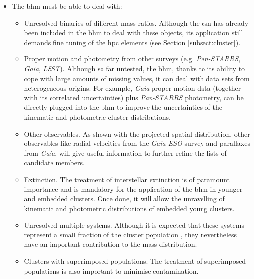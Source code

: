 \begin{itemize}
\item The \gls{bhm} must be able to deal with:
\begin{itemize}
\item Unresolved binaries of different mass ratios. Although the \gls{csn} has already been included in the \gls{bhm} to deal with these objects, its application still demands fine tuning of the \gls{hpc} elements (see Section \ref{subsect:cluster}).
\item Proper motion and photometry from other surveys (e.g. \emph{Pan-STARRS}, \emph{Gaia}, \emph{LSST}). Although so far untested, the \gls{bhm}, thanks to its ability to cope with large amounts of missing values, it can deal with data sets from heterogeneous origins. For example, \emph{Gaia} proper motion data (together with its correlated uncertainties) plus \emph{Pan-STARRS} photometry, can be directly plugged into the \gls{bhm} to improve the uncertainties of the kinematic and photometric cluster distributions. 
\item Other observables. As shown with the projected spatial distribution, other observables like radial velocities from the \emph{Gaia-ESO} survey and parallaxes from \emph{Gaia}, will give useful information to further refine the lists of candidate members.
\item Extinction. The treatment of interstellar extinction is of paramount importance and is mandatory for the application of the \gls{bhm} in younger and embedded clusters. Once done, it will allow the unravelling of kinematic and photometric distributions of embedded young clusters.

\item Unresolved multiple systems. Although it is expected that these systems represent a small fraction of the cluster population \cite[only 4\% for the triple systems][]{Duquennoy1991}, they nevertheless have an important contribution to the mass distribution. 

\item Clusters with superimposed populations. The treatment of superimposed populations is also important to minimise contamination.


\end{itemize}
\end{itemize}
